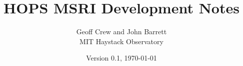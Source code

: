 \documentclass[hidelinks]{article}
\title{ \textbf{HOPS MSRI Development Notes} }
\author{
\large Geoff Crew and John Barrett \\
\Large MIT Haystack Observatory}
\date{Version 0.1, \today}
\let\Oldsection\section
\renewcommand{\section}{\FloatBarrier\Oldsection}
\begin{document}
\maketitle


\tiny
\tableofcontents
\normalsize
\newpage








%
%
\newpage
\addtocounter{section}{1}
\renewcommand{\refname}{\thesection. References}

\label{sec:references}

\printbibliography
%
%
\end{document}
